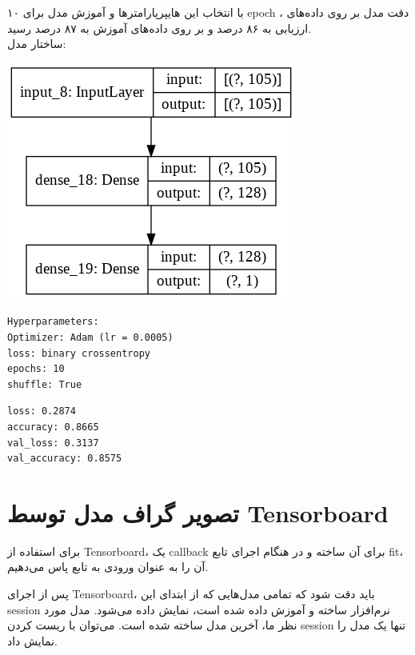 \documentclass{article}
\begin{document}
با انتخاب این هایپرپارامترها و آموزش مدل برای ۱۰ epoch ، دقت مدل بر روی داده‌های ارزیابی به ۸۶ درصد و بر روی داده‌های آموزش به ۸۷ درصد رسید. \\

ساختار مدل:



\begin{center}
	\includegraphics[scale=0.45]{model.png} 
\end{center}    



\begin{latin}
\begin{lstlisting}
Hyperparameters:
Optimizer: Adam (lr = 0.0005)
loss: binary crossentropy
epochs: 10
shuffle: True
\end{lstlisting}
\end{latin}


\begin{latin}
\begin{lstlisting}
loss: 0.2874
accuracy: 0.8665
val_loss: 0.3137
val_accuracy: 0.8575
\end{lstlisting}
\end{latin}


\section{
تصویر گراف مدل توسط Tensorboard
}

برای استفاده از Tensorboard، یک callback برای آن ساخته و در هنگام اجرای تابع fit، آن را به عنوان ورودی به تابع پاس می‌دهیم.

پس از اجرای Tensorboard، باید دقت شود که تمامی مدل‌هایی که از ابتدای این session نرم‌افزار  ساخته و آموزش داده شده است،‌ نمایش داده ‌می‌شود. مدل مورد نظر ما، آخرین مدل ساخته شده است. می‌توان با ریست کردن session تنها یک مدل را نمایش داد.
\end{document}
